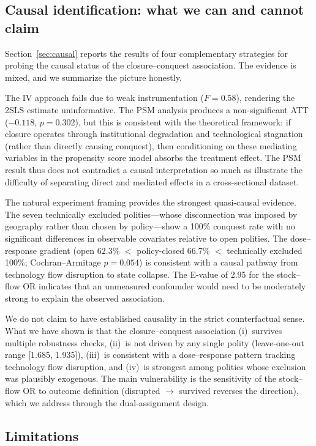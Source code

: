 \documentclass[pdflatex,sn-basic]{sn-jnl}
\theoremstyle{thmstyleone}%
\theoremstyle{thmstyletwo}%
\theoremstyle{thmstylethree}%
\begin{document}
\subsection{Causal identification: what we can and cannot claim}\label{sec:disc-causal}

Section~\ref{sec:causal} reports the results of four complementary strategies for probing the causal status of the closure--conquest association. The evidence is mixed, and we summarize the picture honestly.

The IV approach fails due to weak instrumentation ($F = 0.58$), rendering the 2SLS estimate uninformative. The PSM analysis produces a non-significant ATT ($-0.118$, $p = 0.302$), but this is consistent with the theoretical framework: if closure operates through institutional degradation and technological stagnation (rather than directly causing conquest), then conditioning on these mediating variables in the propensity score model absorbs the treatment effect. The PSM result thus does not contradict a causal interpretation so much as illustrate the difficulty of separating direct and mediated effects in a cross-sectional dataset.

The natural experiment framing provides the strongest quasi-causal evidence. The seven technically excluded polities---whose disconnection was imposed by geography rather than chosen by policy---show a 100\% conquest rate with no significant differences in observable covariates relative to open polities. The dose--response gradient (open 62.3\% $<$ policy-closed 66.7\% $<$ technically excluded 100\%; Cochran--Armitage $p = 0.054$) is consistent with a causal pathway from technology flow disruption to state collapse. The E-value of 2.95 for the stock--flow OR indicates that an unmeasured confounder would need to be moderately strong to explain the observed association.

We do not claim to have established causality in the strict counterfactual sense. What we have shown is that the closure--conquest association (i)~survives multiple robustness checks, (ii)~is not driven by any single polity (leave-one-out range [1.685, 1.935]), (iii)~is consistent with a dose--response pattern tracking technology flow disruption, and (iv)~is strongest among polities whose exclusion was plausibly exogenous. The main vulnerability is the sensitivity of the stock--flow OR to outcome definition (disrupted $\to$ survived reverses the direction), which we address through the dual-assignment design.

\subsection{Limitations}\label{sec:disc-limitations}
\end{document}
